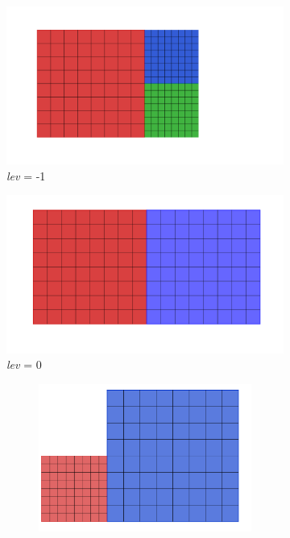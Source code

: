 \begin{figure}[H]
	\centering
	\begin{subfigure}{0.5\textwidth}
		\centering
		\includegraphics[width=0.7\linewidth]{immagini/lev_less1.png}
		\caption{\textit{lev} = -1\newline}
		\label{fig:test1}
	\end{subfigure}%
	\begin{subfigure}{0.5\textwidth}
		\centering
		\includegraphics[width=0.7\linewidth]{immagini/lev0.png}
		\caption{\textit{lev} = 0\newline}
		\label{fig:test2}
	\end{subfigure}
	\begin{subfigure}{0.7\textwidth}
		\centering
		\begin{subfigure}{0.5\textwidth}
			\centering
			\includegraphics[width=0.5\linewidth]{immagini/bloccomaggiore1.png}
		\end{subfigure}%
		\begin{subfigure}{0.5\textwidth}
			\centering

\end{subfigure}
\end{subfigure}
\end{figure}
